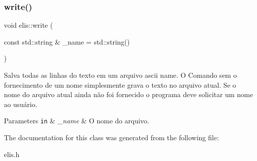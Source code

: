 \subsubsection{\texorpdfstring{write()}{write()}}
{\footnotesize\ttfamily void elis\+::write (\begin{DoxyParamCaption}\item[{const std\+::string \&}]{\+\_\+name = {\ttfamily std\+:\+:string()} }\end{DoxyParamCaption})}



Salva todas as linhas do texto em um arquivo ascii name. O Comando sem o fornecimento de um nome simplesmente grava o texto no arquivo atual. Se o nome do arquivo atual ainda não foi fornecido o programa deve solicitar um nome ao usuário. 


\begin{DoxyParams}[1]{Parameters}
\mbox{\tt in}  & {\em \+\_\+name} & O nome do arquivo. \\
\hline
\end{DoxyParams}


The documentation for this class was generated from the following file\+:\begin{DoxyCompactItemize}
\item 
elis.\+h\end{DoxyCompactItemize}
